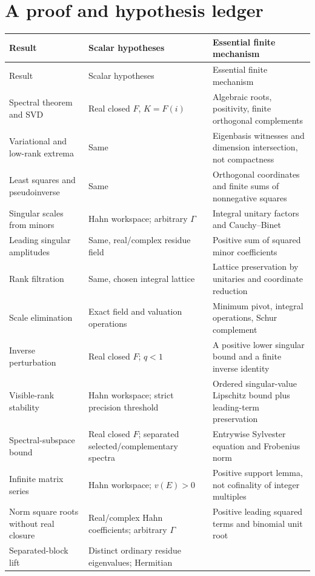 \documentclass[11pt,a4paper]{article}
\numberwithin{equation}{section}
\theoremstyle{definition}
\theoremstyle{remark}
\begin{document}
\appendix
\section{A proof and hypothesis ledger}\label{app:ledger}

\begin{longtable}{@{}P{.30\textwidth}P{.28\textwidth}P{.34\textwidth}@{}}
\toprule
Result & Scalar hypotheses & Essential finite mechanism\\
\midrule\endfirsthead
\toprule Result & Scalar hypotheses & Essential finite mechanism\\\midrule\endhead
Spectral theorem and SVD & Real closed $F$, $K=F(i)$ & Algebraic roots,
positivity, finite orthogonal complements\\
Variational and low-rank extrema & Same & Eigenbasis witnesses and dimension
intersection, not compactness\\
Least squares and pseudoinverse & Same & Orthogonal coordinates and finite
sums of nonnegative squares\\
Singular scales from minors & Hahn workspace; arbitrary $\Gamma$ & Integral unitary
factors and Cauchy--Binet\\
Leading singular amplitudes & Same, real/complex residue field & Positive
sum of squared minor coefficients\\
Rank filtration & Same, chosen integral lattice & Lattice preservation by
unitaries and coordinate reduction\\
Scale elimination & Exact field and valuation operations & Minimum pivot,
integral operations, Schur complement\\
Inverse perturbation & Real closed $F$; $q<1$ & A positive lower singular
bound and a finite inverse identity\\
Visible-rank stability & Hahn workspace; strict precision threshold & Ordered
singular-value Lipschitz bound plus leading-term preservation\\
Spectral-subspace bound & Real closed $F$; separated selected/complementary
spectra & Entrywise Sylvester equation and Frobenius norm\\
Infinite matrix series & Hahn workspace; $v(E)>0$ & Positive support lemma,
not cofinality of integer multiples\\
\addlinespace
Norm square roots without real closure & Real/complex Hahn coefficients;
arbitrary $\Gamma$ & Positive leading squared terms and binomial unit root\\
Separated-block lift & Distinct ordinary residue eigenvalues; Hermitian

\end{longtable}
\end{document}
